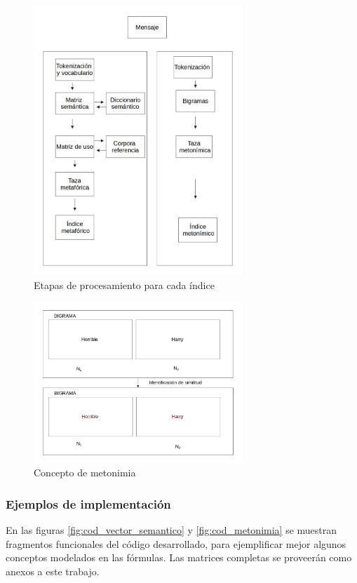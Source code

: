 \documentclass[12pt,letterpaper,twoside]{article}
\begin{document}
\begin{figure}[H]
\centering
\includegraphics[width=0.7\textwidth]{./assets/metodologia.jpg}
\caption{\label{fig:metodologia}Etapas de procesamiento para cada índice}
\end{figure}

\begin{figure}[H]
\centering
\includegraphics[width=0.7\textwidth]{./assets/metonimia.jpg}
\caption{\label{fig:metonimia}Concepto de metonimia}
\end{figure}

\subsubsection{Ejemplos de implementación}
\label{sec:orge18b414}
En las figuras \ref{fig:cod_vector_semantico} y
\ref{fig:cod_metonimia} se muestran fragmentos funcionales del
código desarrollado, para ejemplificar mejor algunos conceptos
modelados en las fórmulas. Las matrices completas se proveerán
como anexos a este trabajo.
\end{document}
